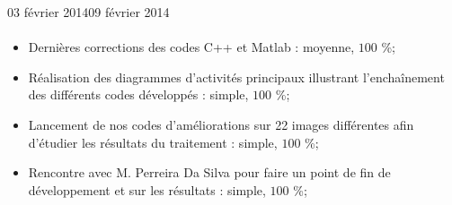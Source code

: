 \documentclass[11pt, french]{report-rd-info}
\begin{document}
\begin{fichesuivi}{03 février 2014}{09 février 2014}
\paragraph{}
	\begin{travaileffectue}
		\begin{itemize}
			\item Dernières corrections des codes C++ et Matlab  : moyenne, $100$ \%;
			\item Réalisation des diagrammes d’activités principaux illustrant l’enchaînement des différents codes développés : simple, $100$ \%;
			\item Lancement de nos codes d’améliorations sur 22 images différentes afin d’étudier les résultats du traitement  : simple, $100$ \%;
			\item Rencontre avec M. Perreira Da Silva pour faire un point de fin de développement et sur les résultats  : simple, $100$ \%;
		\end{itemize}
	\end{travaileffectue}



\end{fichesuivi}
\end{document}
